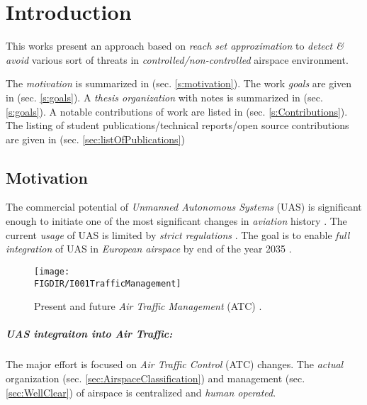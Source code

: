 \setcounter{chapter}{0}
\setcounter{section}{0}
\setcounter{subsection}{0}

\chapter{Introduction}
\noindent This works present an approach based on \emph{reach set approximation} to \emph{detect \& avoid} various sort of threats in \emph{controlled/non-controlled} airspace environment. 

The \emph{motivation} is summarized in (sec. \ref{s:motivation}). The work \emph{goals} are given in (sec. \ref{s:goals}). A \emph{thesis organization} with notes is summarized in (sec. \ref{s:goals}). A notable contributions of work are listed in (sec. \ref{s:Contributions}). The listing of student publications/technical reports/open source contributions are given in (sec. \ref{sec:listOfPublications}) 

\section{Motivation}\label{s:Overview}
\noindent The commercial potential of \emph{Unmanned Autonomous Systems} (UAS) is significant  enough to initiate one of the most significant changes in \emph{aviation} history \cite{airbusUTM2018blueprint}. The current \emph{usage} of UAS is limited by \emph{strict regulations} \cite{icao4444,icaoAnnex2,icaoAnnex11}. The goal is to enable \emph{full integration} of UAS in \emph{European airspace} by end of the year 2035 \cite{eurocontrol2018rpasatm}.


\begin{figure}[H]
    \centering
    \texttt{[image: \\FIGDIR/I001TrafficManagement]}
    \caption{Present and future \emph{Air Traffic Management} (ATC) \cite{airbusUTM2018blueprint}.}
    \label{fig:airTrafficManagementEvolution}
\end{figure}

\paragraph{UAS integraiton into Air Traffic:} The major effort is focused on \emph{Air Traffic Control} (ATC) changes. The \emph{actual} organization (sec. \ref{sec:AirspaceClassification}) and management (sec. \ref{sec:WellClear}) of airspace is centralized and \emph{human operated}.  

